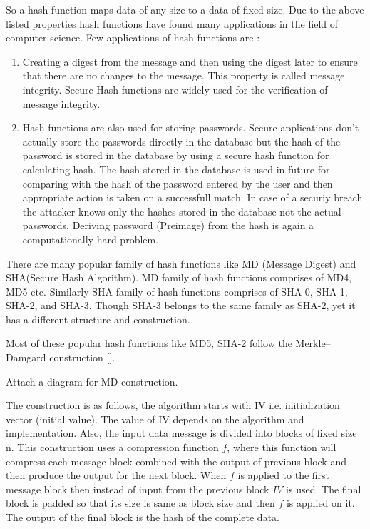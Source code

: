 \documentclass[runningheads]{llncs}
\begin{document}
So a hash function maps data of any size to a data of fixed size. Due to the above listed properties hash functions have found many applications in the field of computer science. Few applications of hash functions are :
\begin{enumerate}
	\item Creating a digest from the message and then using the digest later to ensure that there are no changes to the message. This property is called message integrity. Secure Hash functions are widely used for the verification of message integrity.
	\item Hash functions are also used for storing passwords. Secure applications don't actually store the passwords directly in the database but the hash of the password is stored in the database by using a secure hash function for calculating hash. The hash stored in the database is used in future for comparing with the hash of the password entered by the user and then appropriate action is taken on a successfull match. In case of a securiy breach the attacker knows only the hashes stored in the database not the actual passwords. Deriving password (Preimage) from the hash is again a computationally hard problem.
\end{enumerate}

There are many popular family of hash functions like MD (Message Digest) and SHA(Secure Hash Algorithm). MD family of hash functions comprises of MD4, MD5 etc. Similarly SHA family of hash functions comprises of SHA-0, SHA-1, SHA-2, and SHA-3.
Though SHA-3 belongs to the same family as SHA-2, yet it has a different structure and construction.

Most of these popular hash functions like MD5, SHA-2 follow the Merkle–Damgard construction []. 

Attach a diagram for MD construction.

The construction is as follows, the algorithm starts with IV i.e. initialization vector (initial value). The value of IV depends on the algorithm and implementation. Also, the input data message is divided into blocks of fixed size n.
This construction uses a compression function $f$, where this function will compress each message block combined with the output of previous block and then produce the output for the next block. When $f$ is applied to the first message block then instead of input from the previous block $IV$ is used. The final block is padded so that its size is same as block size and then $f$ is applied on it. The output of the final block is the hash of the complete data.
\end{document}

